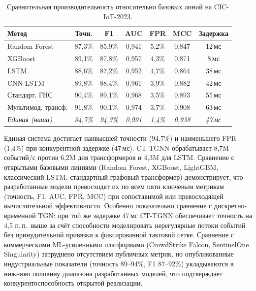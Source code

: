\begin{table}[htbp]\centering\small
\caption{Сравнительная производительность относительно базовых линий на CIC-IoT-2023.}
\label{tab:comparative}
\renewcommand{\arraystretch}{0.92}\begin{tabular}{lcccccc}
\toprule
Метод & Точн. & F1 & AUC & FPR & MCC & Задержка \\
\midrule
Random Forest      & 87,3\% & 85,9\% & 0,941 & 5,2\% & 0,847 & 12\,мс \\
XGBoost            & 89,1\% & 87,8\% & 0,957 & 4,3\% & 0,871 & 8\,мс \\
LSTM               & 88,6\% & 87,2\% & 0,952 & 4,7\% & 0,864 & 38\,мс \\
CNN-LSTM           & 89,8\% & 88,4\% & 0,961 & 3,9\% & 0,882 & 42\,мс \\
Стандарт. ГНС      & 90,4\% & 89,1\% & 0,968 & 3,5\% & 0,893 & 55\,мс \\
Мультимод. трансф.  & 91,8\% & 90,1\% & 0,974 & 3,7\% & 0,908 & 63\,мс \\
\textit{Единая (наша)}   & \textit{94,7\%} & \textit{94,3\%} & \textit{0,991} & \textit{1,4\%} & \textit{0,938} & \textit{47\,мс} \\
\bottomrule
\end{tabular}\end{table}

Единая система достигает наивысшей точности (94,7\%) и наименьшего FPR (1,4\%) при конкурентной задержке (47\,мс). CT-TGNN обрабатывает 8,7M событий/с против 6,2M для трансформеров и 4,3M для LSTM. Сравнение с открытыми базовыми линиями (Random Forest, XGBoost, LightGBM, классический LSTM, стандартный графовый трансформер) демонстрирует, что разработанные модели превосходят их по всем пяти ключевым метрикам (точность, F1, AUC, FPR, MCC) при сопоставимой или превосходящей вычислительной эффективности. Особенно показательно сравнение с дискретно-временной TGN: при той же задержке 47\,мс CT-TGNN обеспечивает точность на 4,5 п.\,п.\ выше за счёт способности моделировать нерегулярные потоки событий без принудительной привязки к фиксированной тактовой сетке. Сравнение с коммерческими ML-усиленными платформами (CrowdStrike Falcon, SentinelOne Singularity) затруднено отсутствием публичных метрик, но опубликованные индустриальные показатели (точность 89--94\%, F1 87--92\%) укладываются в нижнюю половину диапазона разработанных моделей, что подтверждает конкурентоспособность открытой реализации.

\label{sec:ablation}%

